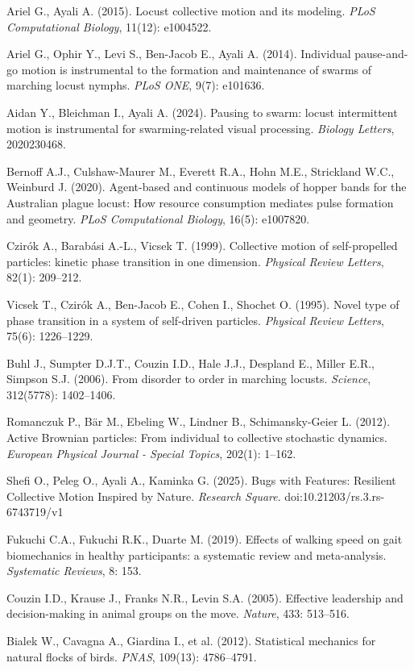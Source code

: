 \documentclass[11pt,a4paper]{article}
\begin{document}

\begin{thebibliography}{9}


Ariel G., Ayali A. (2015). Locust collective motion and its modeling. \emph{PLoS Computational Biology}, 11(12): e1004522.

Ariel G., Ophir Y., Levi S., Ben-Jacob E., Ayali A. (2014). Individual pause-and-go motion is instrumental to the formation and maintenance of swarms of marching locust nymphs. \emph{PLoS ONE}, 9(7): e101636.

Aidan Y., Bleichman I., Ayali A. (2024). Pausing to swarm: locust intermittent motion is instrumental for swarming-related visual processing. \emph{Biology Letters}, 2020230468.

Bernoff A.J., Culshaw-Maurer M., Everett R.A., Hohn M.E., Strickland W.C., Weinburd J. (2020). Agent-based and continuous models of hopper bands for the Australian plague locust: How resource consumption mediates pulse formation and geometry. \emph{PLoS Computational Biology}, 16(5): e1007820.

Czirók A., Barabási A.-L., Vicsek T. (1999). Collective motion of self-propelled particles: kinetic phase transition in one dimension. \emph{Physical Review Letters}, 82(1): 209–212.

Vicsek T., Czirók A., Ben-Jacob E., Cohen I., Shochet O. (1995). Novel type of phase transition in a system of self-driven particles. \emph{Physical Review Letters}, 75(6): 1226–1229.

Buhl J., Sumpter D.J.T., Couzin I.D., Hale J.J., Despland E., Miller E.R., Simpson S.J. (2006). From disorder to order in marching locusts. \emph{Science}, 312(5778): 1402–1406.

Romanczuk P., Bär M., Ebeling W., Lindner B., Schimansky-Geier L. (2012). Active Brownian particles: From individual to collective stochastic dynamics. \emph{European Physical Journal - Special Topics}, 202(1): 1–162.


Shefi O., Peleg O., Ayali A., Kaminka G. (2025). Bugs with Features: Resilient Collective Motion Inspired by Nature. \emph{Research Square}. doi:10.21203/rs.3.rs-6743719/v1

Fukuchi C.A., Fukuchi R.K., Duarte M. (2019). Effects of walking speed on gait biomechanics in healthy participants: a systematic review and meta-analysis. \emph{Systematic Reviews}, 8: 153.

Couzin I.D., Krause J., Franks N.R., Levin S.A. (2005). Effective leadership and decision-making in animal groups on the move. \emph{Nature}, 433: 513–516.

Bialek W., Cavagna A., Giardina I., et al. (2012). Statistical mechanics for natural flocks of birds. \emph{PNAS}, 109(13): 4786–4791.



\end{thebibliography}
\end{document}

